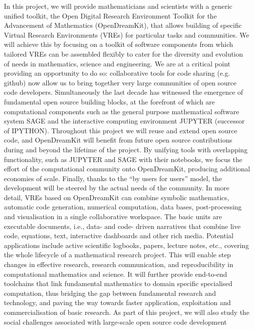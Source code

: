 \documentclass[12pt]{amsbook}
\begin{document}
In this project, we will provide mathematicians and scientists with a generic unified toolkit, the Open Digital Research
Environment Toolkit for the Advancement of Mathematics (OpenDreamKit), that allows building of specific Virtual Research
Environments (VREs) for particular tasks and communities.
We will achieve this by focusing on a toolkit of software components from which tailored VREs can be assembled flexibly to
cater for the diversity and evolution of needs in mathematics, science and engineering. We are at a critical point providing an
opportunity to do so: collaborative tools for code sharing (e.g. github) now allow us to bring together very large communities
of open source code developers.
Simultaneously the last decade has witnessed the emergence of fundamental open source building blocks, at the forefront
of which are computational components such as the general purpose mathematical software system SAGE and the interactive
computing environment JUPYTER (successor of IPYTHON). Throughout this project we will reuse and extend open source
code, and OpenDreamKit will benefit from future open source contributions during and beyond the lifetime of the project.
By unifying tools with overlapping functionality, such as JUPYTER and SAGE with their notebooks, we focus the effort of the
computational community onto OpenDreamKit, producing additional economies of scale. Finally, thanks to the “by users for
users” model, the development will be steered by the actual needs of the community.
In more detail, VREs based on OpenDreamKit can combine symbolic mathematics, automatic code generation, numerical
computation, data bases, post-processing and visualisation in a single collaborative workspace. The basic units are executable
documents, i.e., data- and code- driven narratives that combine live code, equations, text, interactive dashboards
and other rich media. Potential applications include active scientific logbooks, papers, lecture notes, etc., covering the whole
lifecycle of a mathematical research project.
This will enable step changes in effective research, research communication, and reproducibility in computational mathematics
and science. It will further provide end-to-end toolchains that link fundamental mathematics to domain specific
specialised computation, thus bridging the gap between fundamental research and technology, and paving the way towards
faster application, exploitation and commercialisation of basic research.
As part of this project, we will also study the social challenges associated with large-scale open source code development
\end{document}
